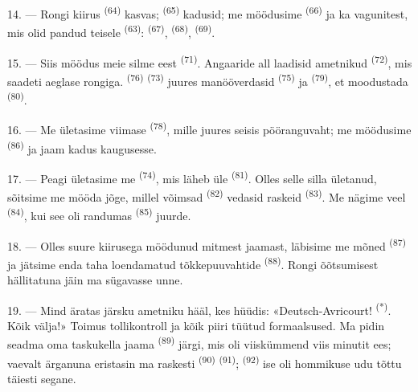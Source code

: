 \VUsaut{3.0mm}
\VUsaut{3.0mm}

14. --- Rongi kiirus  \textsuperscript{(64)} kasvas;
 \textsuperscript{(65)} kadusid; me möödusime 
\textsuperscript{(66)} ja ka vagunitest, mis olid pandud teisele 
\textsuperscript{(63)}:  \textsuperscript{(67)},
 \textsuperscript{(68)}, 
\textsuperscript{(69)}.


15. --- Siis möödus meie silme eest  \textsuperscript{(71)}. Angaaride
all laadisid ametnikud  \textsuperscript{(72)}, mis saadeti aeglase rongiga.
 \textsuperscript{(76)}  \textsuperscript{(73)}
juures manööverdasid  \textsuperscript{(75)} ja  \textsuperscript{(79)}, et moodustada 
\textsuperscript{(80)}.

16. --- Me ületasime viimase  \textsuperscript{(78)}, mille juures
seisis pööranguvaht; me möödusime  \textsuperscript{(86)} ja jaam
kadus kaugusesse.

17. --- Peagi ületasime me  \textsuperscript{(74)}, mis läheb üle
 \textsuperscript{(81)}. Olles selle silla ületanud, sõitsime me mööda jõge,
millel võimsad  \textsuperscript{(82)} vedasid raskeid 
\textsuperscript{(83)}. Me nägime veel  \textsuperscript{(84)}, kui see
oli randumas  \textsuperscript{(85)} juurde.

18. --- Olles suure kiirusega möödunud mitmest jaamast, läbisime me mõned
 \textsuperscript{(87)} ja jätsime enda taha loendamatud tõkkepuuvahtide
 \textsuperscript{(88)}. Rongi õõtsumisest hällitatuna jäin ma sügavasse
unne.

\VUsaut{3.0mm}
\VUsaut{3.0mm}

19. --- Mind äratas järsku ametniku hääl, kes hüüdis: «Deutsch-Avricourt!
\textsuperscript{(*)}. Kõik välja!» Toimus tollikontroll ja kõik piiri tüütud
formaalsused. Ma pidin seadma oma taskukella jaama 
\textsuperscript{(89)} järgi, mis oli viiskümmend viis minutit ees; vaevalt ärganuna
eristasin ma raskesti  \textsuperscript{(90)} 
\textsuperscript{(91)};  \textsuperscript{(92)} ise oli hommikuse udu
tõttu täiesti segane.


